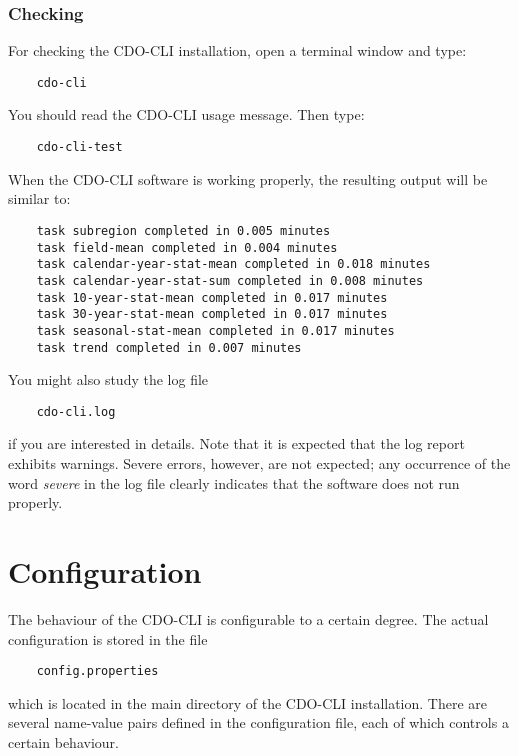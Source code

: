 \documentclass[
square
,pdftex
]{refrep}
\begin{document}
\subsection{Checking}
For checking the CDO-CLI installation, open a terminal window and type:

\begin{verbatim}
    cdo-cli
\end{verbatim}

You should read the CDO-CLI usage message. Then type:
 
\begin{verbatim}
    cdo-cli-test
\end{verbatim}

When the CDO-CLI software is working properly, the resulting output will be
similar to:

\begin{verbatim}
    task subregion completed in 0.005 minutes
    task field-mean completed in 0.004 minutes
    task calendar-year-stat-mean completed in 0.018 minutes
    task calendar-year-stat-sum completed in 0.008 minutes
    task 10-year-stat-mean completed in 0.017 minutes
    task 30-year-stat-mean completed in 0.017 minutes
    task seasonal-stat-mean completed in 0.017 minutes
    task trend completed in 0.007 minutes
\end{verbatim}

You might also study the log file

\begin{verbatim}
    cdo-cli.log
\end{verbatim}

if you are interested in details. Note that it is expected that the log
report exhibits warnings. Severe errors, however, are not expected; any
occurrence of the word \emph{severe} in the log file clearly indicates
that the software does not run properly.

\chapter{Configuration}
\label{configuration}

The behaviour of the CDO-CLI is configurable to a certain degree. The
actual configuration is stored in the file

\begin{verbatim}
    config.properties
\end{verbatim}

which is located in the main directory of the CDO-CLI installation. There
are several name-value pairs defined in the configuration file, each of which
controls a certain behaviour.
\end{document}

